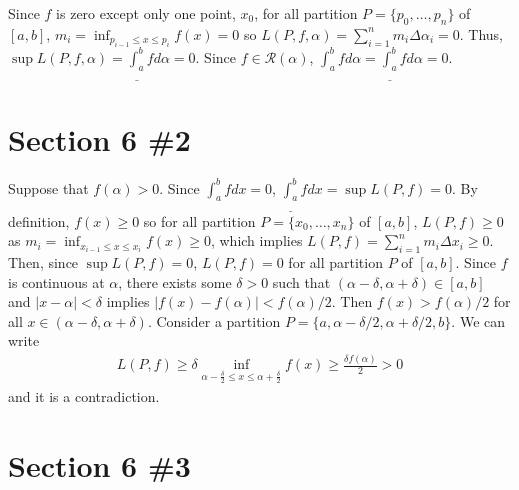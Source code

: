 \documentclass{scrartcl}
\begin{document}
Since \(f\) is zero except only one point, \(x_0\), for all partition \(P = \{p_0, \dots, p_n\}\) of \([a, b]\), \(m_i = \inf_{p_{i - 1} \leq x \leq p_i} f(x) = 0\) so \(L(P, f, \alpha) = \sum^n_{i = 1} m_i \Delta\alpha_i = 0\).
Thus, \(\sup L(P, f, \alpha) = \underline{\int^b_a} f d\alpha = 0\).
Since \(f \in \mathscr{R}(\alpha)\), \(\int^b_a f d\alpha = \underline{\int^b_a} f d\alpha = 0\).

\section{Section 6 \#2}
Suppose that \(f(\alpha) > 0\).
Since \(\int^b_a f dx = 0\), \(\underline{\int^b_a} f dx = \sup L(P, f) = 0\).
By definition, \(f(x) \geq 0\) so for all partition \(P = \{x_0, \dots, x_n\}\) of \([a, b]\), \(L(P, f) \geq 0\) as \(m_i = \inf_{x_{i - 1} \leq x \leq x_i} f(x) \geq 0\), which implies \(L(P, f) = \sum^n_{i = 1} m_i \Delta x_i \geq 0\).
Then, since \(\sup L(P, f) = 0\), \(L(P, f) = 0\) for all partition \(P\) of \([a, b]\).
Since \(f\) is continuous at \(\alpha\), there exists some \(\delta > 0\) such that \((\alpha - \delta, \alpha + \delta) \in [a, b]\) and \(|x - \alpha| < \delta\) implies \(|f(x) - f(\alpha)| < f(\alpha) / 2\).
Then \(f(x) > f(\alpha) / 2\) for all \(x \in (\alpha - \delta, \alpha + \delta)\).
Consider a partition \(P = \{a, \alpha - \delta / 2, \alpha + \delta / 2, b\}\).
We can write
\begin{align*}
  L(P, f) \geq \delta \inf_{\alpha - \frac{\delta}{2} \leq x \leq \alpha + \frac{\delta}{2}} f(x) \geq \frac{\delta f(\alpha)}{2} > 0
\end{align*}
and it is a contradiction.

\section{Section 6 \#3}
\end{document}
